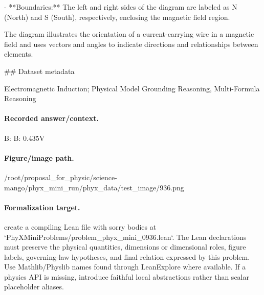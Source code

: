 - **Boundaries:** The left and right sides of the diagram are labeled as N (North) and S (South), respectively, enclosing the magnetic field region.

The diagram illustrates the orientation of a current-carrying wire in a magnetic field and uses vectors and angles to indicate directions and relationships between elements.

\#\# Dataset metadata

Electromagnetic Induction; Physical Model Grounding Reasoning, Multi-Formula Reasoning

\paragraph{Recorded answer/context.}
B: B: 0.435V

\paragraph{Figure/image path.}
/root/proposal\_for\_physic/science-mango/phyx\_mini\_run/phyx\_data/test\_image/936.png

\paragraph{Formalization target.}
create a compiling Lean file with sorry bodies at `PhyXMiniProblems/problem\_phyx\_mini\_0936.lean`. The Lean declarations must preserve the physical quantities, dimensions or dimensional roles, figure labels, governing-law hypotheses, and final relation expressed by this problem.
Use Mathlib/Physlib names found through LeanExplore where available. If a physics API is missing, introduce faithful local abstractions rather than scalar placeholder aliases.


